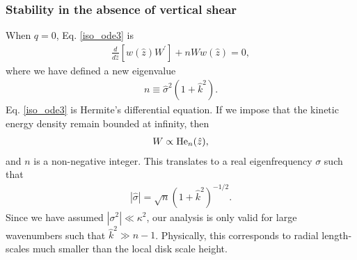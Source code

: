 \subsubsection{Stability in the absence of vertical shear}
When $q=0$, Eq. \ref{iso_ode3} is
\begin{align}\label{hermite_ode}
  \frac{d}{d\hat{z}}\left[w(\hat{z})W^\prime \right] + nW
  w(\hat{z}) =0, 
\end{align}
where we have defined a new eigenvalue
\begin{align}
  n \equiv \hat{\sigma}^2(1+\hat{k}^2). 
\end{align} 
Eq. \ref{iso_ode3} is Hermite's differential equation. If we impose
that the kinetic energy density remain bounded at infinity, then  
\begin{align}
  W \propto \operatorname{He}_n(\hat{z}),
\end{align}
and $n$ is a non-negative integer. This translates to a real
eigenfrequency $\sigma$ such that
\begin{align}
  \left|\hat{\sigma}\right| = \sqrt{n}
  \left(1+\hat{k}^2\right)^{-1/2}. 
\end{align}
Since we have assumed $|\sigma^2|\ll \kappa^2$, our analysis is only
valid for large wavenumbers such that $\hat{k}^2\gg 
n-1$. Physically, this corresponds to radial length-scales much
smaller than the local disk scale height. 


